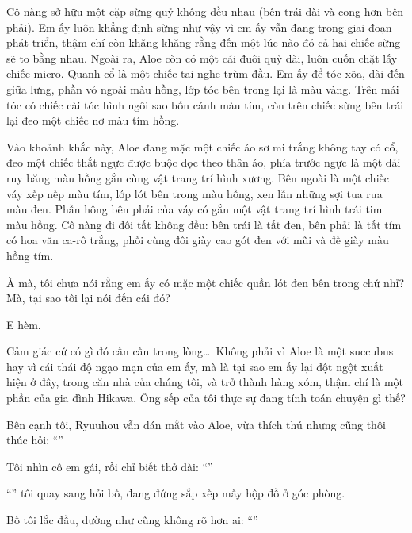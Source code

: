 \documentclass[../main.tex]{subfiles}
\begin{document}
Cô nàng sở hữu một cặp sừng quỷ không đều nhau (bên trái dài và cong hơn bên phải). Em ấy luôn khẳng định sừng như vậy vì em ấy vẫn đang trong giai đoạn phát triển, thậm chí còn khăng khăng rằng đến một lúc nào đó cả hai chiếc sừng sẽ to bằng nhau. Ngoài ra, Aloe còn có một cái đuôi quỷ dài, luôn cuốn chặt lấy chiếc micro. Quanh cổ là một chiếc tai nghe trùm đầu. Em ấy để tóc xõa, dài đến giữa lưng, phần vỏ ngoài màu hồng, lớp tóc bên trong lại là màu vàng. Trên mái tóc có chiếc cài tóc hình ngôi sao bốn cánh màu tím, còn trên chiếc sừng bên trái lại đeo một chiếc nơ màu tím hồng.

Vào khoảnh khắc này, Aloe đang mặc một chiếc áo sơ mi trắng không tay có cổ, đeo một chiếc thắt ngực được buộc dọc theo thân áo, phía trước ngực là một dải ruy băng màu hồng gắn cùng vật trang trí hình xương. Bên ngoài là một chiếc váy xếp nếp màu tím, lớp lót bên trong màu hồng, xen lẫn những sợi tua rua màu đen. Phần hông bên phải của váy có gắn một vật trang trí hình trái tim màu hồng. Cô nàng đi đôi tất không đều: bên trái là tất đen, bên phải là tất tím có hoa văn ca-rô trắng, phối cùng đôi giày cao gót đen với mũi và đế giày màu hồng tím.

À mà, tôi chưa nói rằng em ấy có mặc một chiếc quần lót đen bên trong chứ nhỉ? Mà, tại sao tôi lại nói đến cái đó?

E hèm.

\chrint

Cảm giác cứ có gì đó cấn cấn trong lòng\dots\ Không phải vì Aloe là một succubus hay vì cái thái độ ngạo mạn của em ấy, mà là tại sao em ấy lại đột ngột xuất hiện ở đây, trong căn nhà của chúng tôi, và trở thành hàng xóm, thậm chí là một phần của gia đình Hikawa. Ông sếp của tôi thực sự đang tính toán chuyện gì thế?

Bên cạnh tôi, Ryuuhou vẫn dán mắt vào Aloe, vừa thích thú nhưng cũng thôi thúc hỏi: ``''

Tôi nhìn cô em gái, rồi chỉ biết thở dài: ``''

``''  tôi quay sang hỏi bố, đang đứng sắp xếp mấy hộp đồ ở góc phòng.

Bố tôi lắc đầu, dường như cũng không rõ hơn ai: ``''
\end{document}
